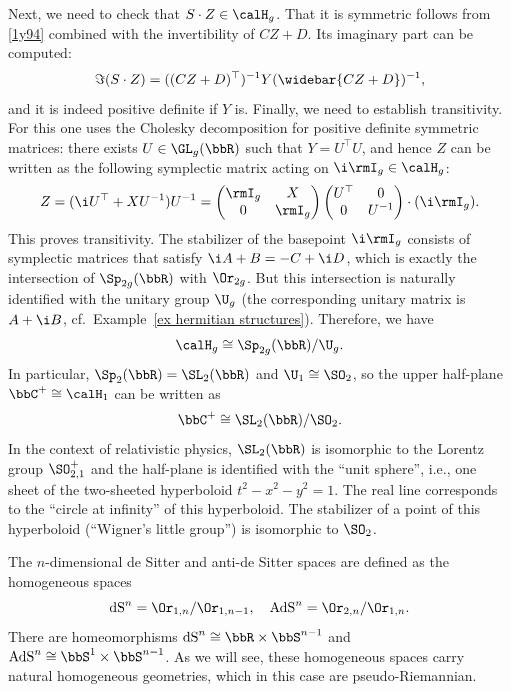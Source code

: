 \begin{example}
    Next, we need to check that $S\cdot Z\in \calH_g$. That it is symmetric follows from \eqref{1y94} combined with the invertibility of $CZ+D$. Its imaginary part can be computed:
    \[\Im (S\cdot Z)=((CZ+D)^\top )^{-1}Y(\widebar{CZ+D})^{-1},\]
    and it is indeed positive definite if $Y$ is. Finally, we need to establish transitivity. For this one uses the Cholesky decomposition for positive definite symmetric matrices: there exists $U\in\GL_g(\bbR)$ such that $Y=U^\top U$, and hence $Z$ can be written as the following symplectic matrix acting on $\i \rmI_g\in \calH_g$:
    \[Z=(\i U^\top +XU^{-1})U^{-1}=\begin{pmatrix}
        \rmI_g & X\\
        0 & \rmI_g
    \end{pmatrix}\begin{pmatrix}
        U^\top  & 0\\
        0 & U^{-1}
    \end{pmatrix}\cdot(\i \rmI_g).\]
    This proves transitivity. The stabilizer of the basepoint $\i \rmI_g$ consists of symplectic matrices that satisfy $\i A+B=-C+\i D$, which is exactly the intersection of $\Sp_{2g}(\bbR)$ with $\Or_{2g}$. But this intersection is naturally identified with the unitary group $\U_g$ (the corresponding unitary matrix is $A+\i B$, cf.\ Example~\ref{ex hermitian structures}). Therefore, we have 
    \[\calH_g \cong \Sp_{2g}(\bbR)\slash \U_g.\]
    In particular, $\Sp_2(\bbR)=\SL_2(\bbR)$ and $\U_1\cong\SO_2$, so the upper half-plane $\bbC^+\cong \calH_1$ can be written as 
    \[\bbC^+\cong\SL_2(\bbR)\slash \SO_2.\]
    In the context of relativistic physics, $\SL_2(\bbR)$ is isomorphic to the Lorentz group $\SO^+_{2,1}$ and the half-plane is identified with the ``unit sphere'', i.e., one sheet of the two-sheeted hyperboloid $t^2-x^2-y^2=1$. The real line corresponds to the ``circle at infinity'' of this hyperboloid. The stabilizer of a point of this hyperboloid (``Wigner's little group'') is isomorphic to $\SO_2$.
\end{example}

\begin{example}\label{ex dS and AdS}
    The $n$-dimensional de Sitter and anti-de Sitter spaces are defined as the homogeneous spaces 
    \[\mathrm{dS}^n=\Or_{1,n}\slash \Or_{1,n-1},\quad \mathrm{AdS}^n=\Or_{2,n}\slash \Or_{1,n}.\]
    There are homeomorphisms $\mathrm{dS}^n\cong \bbR\times\bbS^{n-1}$ and $\mathrm{AdS}^n\cong \bbS^1\times\bbS^{n-1}$. As we will see, these homogeneous spaces carry natural homogeneous geometries, which in this case are pseudo-Riemannian.
\end{example}

